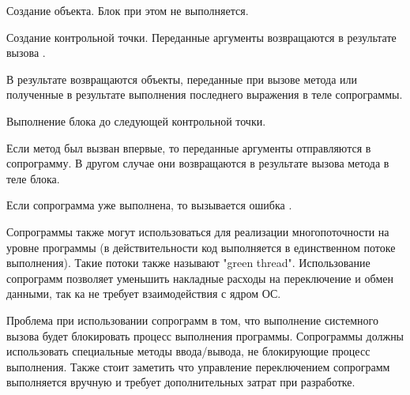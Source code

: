 \begin{methodlist}
  Создание объекта. Блок при этом не выполняется. 

  Создание контрольной точки. Переданные аргументы возвращаются в результате вызова .

  В результате возвращаются объекты, переданные при вызове метода  или полученные в результате выполнения последнего выражения в теле сопрограммы.
 
  Выполнение блока до следующей контрольной точки.

  Если метод был вызван впервые, то переданные аргументы отправляются в сопрограмму. В другом случае они возвращаются в результате вызова метода  в теле блока. 

  Если сопрограмма уже выполнена, то вызывается ошибка .
\end{methodlist}

Сопрограммы также могут использоваться для реализации многопоточности на уровне программы (в действительности код выполняется в единственном потоке выполнения). Такие потоки также называют "green thread". Использование сопрограмм позволяет уменьшить накладные расходы на переключение и обмен данными, так ка не требует взаимодействия с ядром ОС.

Проблема при использовании сопрограмм в том, что выполнение системного вызова будет блокировать процесс выполнения программы. Сопрограммы должны использовать специальные методы ввода/вывода, не блокирующие процесс выполнения. Также стоит заметить что управление переключением сопрограмм выполняется вручную и требует дополнительных затрат при разработке.